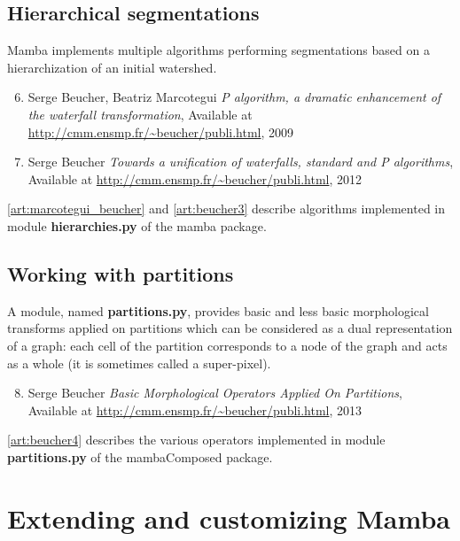 \documentclass[a4paper,10pt,oneside]{article}
\begin{document}
\subsection{Hierarchical segmentations}
\label{cha:hierar_seg}

Mamba implements multiple algorithms performing segmentations based on
a hierarchization of an initial watershed.

\begin{enumerate}
\setcounter{enumi}{5}
\item \label{art:marcotegui_beucher} Serge Beucher, Beatriz Marcotegui
\emph{P algorithm, a dramatic enhancement of the waterfall transformation},
Available at \url{http://cmm.ensmp.fr/~beucher/publi.html}, 2009

\item \label{art:beucher3} Serge Beucher
\emph{Towards a unification of waterfalls, standard and P algorithms},
Available at \url{http://cmm.ensmp.fr/~beucher/publi.html}, 2012
\end{enumerate}

\ref{art:marcotegui_beucher} and \ref{art:beucher3} describe algorithms
implemented in module \textbf{hierarchies.py} of the mamba package.

\subsection{Working with partitions}
\label{cha:partitions}

A module, named \textbf{partitions.py}, provides basic and less basic
morphological transforms applied on partitions which can be considered as a dual representation
of a graph: each cell of the partition corresponds to a node of the graph and acts as a whole
(it is sometimes called a super-pixel).

\begin{enumerate}
\setcounter{enumi}{7}
\item \label{art:beucher4} Serge Beucher
\emph{Basic Morphological Operators Applied On Partitions},
Available at \url{http://cmm.ensmp.fr/~beucher/publi.html}, 2013
\end{enumerate}

\ref{art:beucher4} describes the various operators implemented in
module \textbf{partitions.py} of the mambaComposed package.

\pagebreak

\section{Extending and customizing Mamba}
\end{document}
